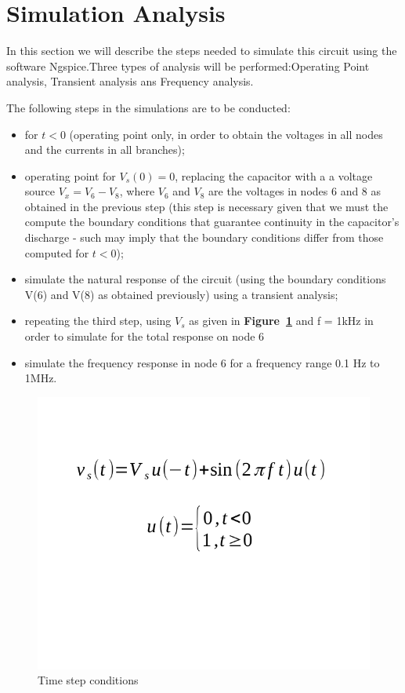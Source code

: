 \section{Simulation Analysis}
\label{sec:simulation}
In this section we will describe the steps needed to simulate this circuit using the software Ngspice.Three types of analysis will be performed:Operating Point analysis, Transient analysis ans Frequency analysis.

The following steps in the simulations are to be conducted: 
\begin{itemize}
	\item for $t<0$ (operating point only, in order to obtain the voltages in all nodes and the currents in all branches);
	\item operating point for  $V_s(0) = 0$, replacing the capacitor with a a voltage source $V_x = V_6-V_8$, where $V_6$ and $V_8$ are the voltages in nodes 6 and 8 as obtained in the previous step (this step is necessary given that we must the compute the boundary conditions that guarantee continuity in the capacitor's discharge - such may imply that the boundary conditions differ from those computed for $t<0$);
	\item simulate the natural response of the circuit (using the boundary conditions V(6) and V(8) as obtained previously) using a transient analysis;
	\item repeating the third step, using {\it $V_s$} as given in \textbf{Figure~\ref{fig:time_step}} and f = 1kHz  in order to simulate for the total response on node 6
	\item simulate the frequency response in node 6 for a frequency range 0.1 Hz to 1MHz.
\end{itemize}
 
 \begin{figure}[H] \centering
\includegraphics[width=0.5\linewidth]{time_step.pdf}
\caption{Time step conditions}
\label{fig:time_step}
\end{figure}

